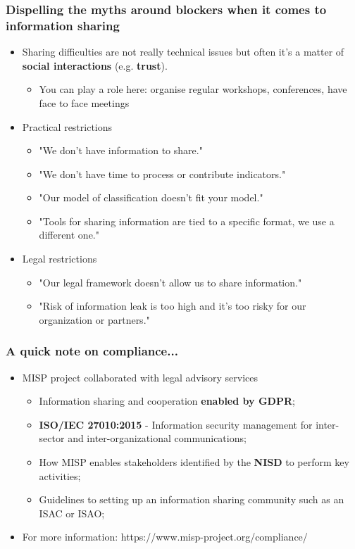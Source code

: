 \begin{frame}
	\frametitle{Dispelling the myths around blockers when it comes to information sharing}
	\begin{itemize}
		\item Sharing difficulties are not really technical issues but often it's a matter of {\bf social interactions} (e.g. {\bf trust}).
		\begin{itemize}
			\item You can play a role here: organise regular workshops, conferences, have face to face meetings
		\end{itemize}
		\item Practical restrictions
		\begin{itemize}
			\item "We don't have information to share."
			\item "We don't have time to process or contribute indicators."
			\item "Our model of classification doesn't fit your model."
			\item "Tools for sharing information are tied to a specific format, we use a different one."
		\end{itemize}
		\item Legal restrictions
		\begin{itemize}
			\item "Our legal framework doesn't allow us to share information."
			\item "Risk of information leak is too high and it's too risky for our organization or partners."
		\end{itemize}
	\end{itemize}
\end{frame}

\begin{frame}
\frametitle{A quick note on compliance...}
\begin{itemize}
	\item MISP project collaborated with legal advisory services
	\begin{itemize}
		\item Information sharing and cooperation {\bf enabled by GDPR};
        \item {\bf ISO/IEC 27010:2015} - Information security management for inter-sector and inter-organizational communications;
		\item How MISP enables stakeholders identified by the {\bf NISD} to perform key activities;
        \item Guidelines to setting up an information sharing community such as an ISAC or ISAO;
	\end{itemize}
	\item For more information: https://www.misp-project.org/compliance/
\end{itemize}
\end{frame}


